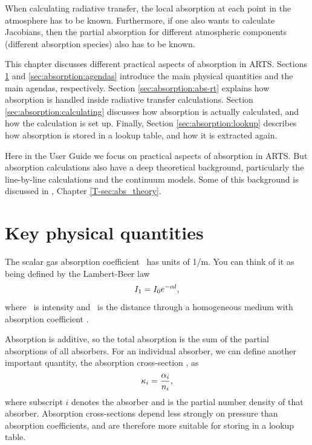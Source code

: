 When calculating radiative transfer, the local absorption 
at each point in the atmosphere has to be known.  Furthermore, if one
also wants to calculate Jacobians, then the partial absorption
for different atmospheric components (different
absorption species) also has to be known.   

This chapter discusses different practical aspects of absorption in
ARTS. Sections \ref{sec:absorption:quantities} and
\ref{sec:absorption:agendas} introduce the main physical quantities
and the main agendas, respectively. Section
\ref{sec:absorption:abs-rt} explains how absorption is handled inside
radiative transfer calculations.  Section
\ref{sec:absorption:calculating} discusses how absorption is actually
calculated, and how the calculation is set up.  Finally, Section
\ref{sec:absorption:lookup} describes how absorption is stored in a
lookup table, and how it is extracted again.

Here in the User Guide we focus on practical aspects of absorption in
ARTS. But absorption calculations also have a deep theoretical
background, particularly the line-by-line calculations and the
continuum models.  Some of this background is discussed in \theory,
Chapter \ref{T-sec:abs_theory}. 


\section{Key physical quantities}
\label{sec:absorption:quantities}

The scalar gas absorption coefficient \AbsCoef\ has units of 1/m.  You
can think of it as being defined by the Lambert-Beer law
\begin{equation}
  I_1 = I_0 e^{-{\alpha} l},  
\end{equation}
where \Mpi\ is intensity and \PpathLng\ is the distance through a
homogeneous medium with absorption coefficient \AbsCoef.  

Absorption is additive, so the total absorption is the sum of the
partial absorptions of all absorbers.  For an individual absorber, we
can define another important quantity, the absorption cross-section
, as
\begin{equation}
  {\kappa}_{i} = \frac{{\alpha}_{i}}{{n}_{i}},
\end{equation}
where subscript $i$ denotes the absorber and  is the partial
number density of that absorber.  Absorption cross-sections depend
less strongly on pressure than absorption coefficients, and are
therefore more suitable for storing in a lookup table.

